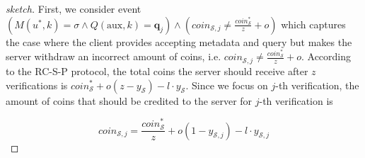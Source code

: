 \begin{proof}[sketch]
  First, we consider event  $(M(u^{\scriptscriptstyle *},k)= \sigma  \wedge Q(\text{aux},k)= \bm{q}_{\scriptscriptstyle j}) \wedge
  (coin_{\scriptscriptstyle\mathcal{S},j}\neq  \frac{coin_{\scriptscriptstyle\mathcal S}^{\scriptscriptstyle*}}{z}+o)$ which captures the case where the client provides  accepting metadata and query  but makes the server withdraw an incorrect amount of coins, i.e. $coin_{\scriptscriptstyle\mathcal{S},j}\neq  \frac{coin_{\scriptscriptstyle\mathcal S}^{\scriptscriptstyle*}}{z}+o$. According to the RC-S-P protocol, the total coins the server should receive after $z$ verifications is $coin^{\scriptscriptstyle *}_{\scriptscriptstyle\mathcal S}+o(z-y_{\scriptscriptstyle\mathcal S})-l\cdot y_{\scriptscriptstyle\mathcal S}$. Since we focus on  $j$-th verification, the amount of  coins that should be credited to the server for $j$-th verification is
  
  \begin{equation}\label{equ::what-server-recives-in-j}
   coin_{\scriptscriptstyle\mathcal{S},j}=\frac{coin^{\scriptscriptstyle *}_{\scriptscriptstyle\mathcal S}}{z}+o(1-y_{\scriptscriptstyle\mathcal {S},j})-l\cdot y_{\scriptscriptstyle\mathcal {S},j}
     \end{equation}
  
  
  

\end{proof}
